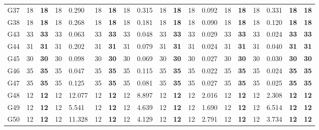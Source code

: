 \documentclass[12pt, a4paper]{article}%
\numberwithin{equation}{section}
\theoremstyle{plain}
\begin{document}
{\begin{landscape}
\begin{longtable}{lllllllllllllllllll}
						G37                       & 18   & \textbf{18}  & 18  & 0.290  & 18   & \textbf{18}  & 18  & 0.315 & 18   & \textbf{18}  & 18  & 0.092  & 18   & \textbf{18}  & 18  & 0.331 & \textbf{18}             & \textbf{18}          \\
						G38                       & 18   & \textbf{18}  & 18  & 0.268  & 18   & \textbf{18}  & 18  & 0.181 & 18   & \textbf{18}  & 18  & 0.090  & 18   & \textbf{18}  & 18  & 0.120 & \textbf{18}             & \textbf{18}          \\
						G43                       & 33   & \textbf{33}  & 33  & 0.063  & 33   & \textbf{33}  & 33  & 0.048 & 33   & \textbf{33}  & 33  & 0.029  & 33   & \textbf{33}  & 33  & 0.024 & \textbf{33}             & \textbf{33}          \\
						G44                       & 31   & \textbf{31}  & 31  & 0.202  & 31   & \textbf{31}  & 31  & 0.079 & 31   & \textbf{31}  & 31  & 0.024  & 31   & \textbf{31}  & 31  & 0.040 & \textbf{31}             & \textbf{31}          \\
						G45                       & 30   & \textbf{30}  & 30  & 0.098  & 30   & \textbf{30}  & 30  & 0.069 & 30   & \textbf{30}  & 30  & 0.027  & 30   & \textbf{30}  & 30  & 0.030 & \textbf{30}             & \textbf{30}          \\
						G46                       & 35   & \textbf{35}  & 35  & 0.047  & 35   & \textbf{35}  & 35  & 0.115 & 35   & \textbf{35}  & 35  & 0.022  & 35   & \textbf{35}  & 35  & 0.024 & \textbf{35}             & \textbf{35}          \\
						G47                       & 35   & \textbf{35}  & 35  & 0.125  & 35   & \textbf{35}  & 35  & 0.081 & 35   & \textbf{35}  & 35  & 0.027  & 35   & \textbf{35}  & 35  & 0.025 & \textbf{35}             & \textbf{35}          \\
						G48                       & 12   & \textbf{12}  & 12  & 12.077 & 12   & \textbf{12}  & 12  & 8.897 & 12   & \textbf{12}  & 12  & 2.016  & 12   & \textbf{12}  & 12  & 2.308 & \textbf{12}             & \textbf{12}          \\
						G49                       & 12   & \textbf{12}  & 12  & 5.541  & 12   & \textbf{12}  & 12  & 4.639 & 12   & \textbf{12}  & 12  & 1.690  & 12   & \textbf{12}  & 12  & 6.514 & \textbf{12}             & \textbf{12}          \\
						G50                       & 12   & \textbf{12}  & 12  & 11.328 & 12   & \textbf{12}  & 12  & 4.129 & 12   & \textbf{12}  & 12  & 2.791  & 12   & \textbf{12}  & 12  & 3.734 & \textbf{12}             & \textbf{12}          \\

\end{longtable}
\end{landscape}}
\end{document}
